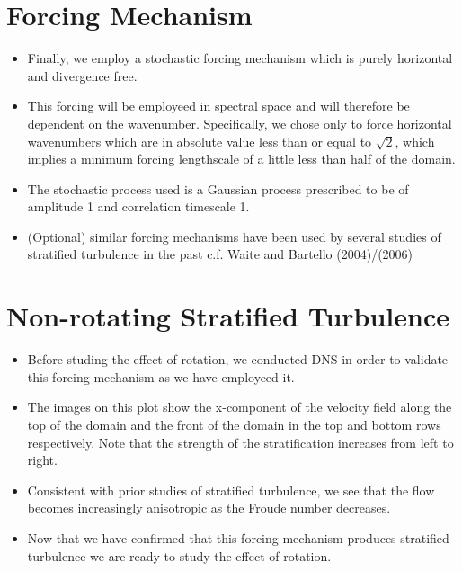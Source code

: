 \documentclass{article}
\begin{document}
\section{Forcing Mechanism}
\begin{itemize}
    \item Finally, we employ a stochastic forcing mechanism which is purely
    horizontal and divergence free. 
    \item This forcing will be employeed in spectral space and will therefore be
    dependent on the wavenumber. Specifically, we chose only to force horizontal
    wavenumbers which are in absolute value less than or equal to $\sqrt{2}$,
    which implies a minimum forcing lengthscale of a little less than half of
    the domain.
    \item The stochastic process used is a Gaussian process prescribed to be of
    amplitude 1 and correlation timescale 1. 
    \item (Optional) similar forcing mechanisms have been used by several
    studies of stratified turbulence in the past c.f. Waite and Bartello
    (2004)/(2006)
\end{itemize}

\section{Non-rotating Stratified Turbulence}
\begin{itemize}
    \item Before studing the effect of rotation, we conducted DNS in order to
    validate this forcing mechanism as we have employeed it. 
    \item The images on this plot show the x-component of the velocity field
    along the top of the domain and the front of the domain in the top and
    bottom rows respectively. Note that the strength of the stratification
    increases from left to right. 
    \item Consistent with prior studies of stratified turbulence, we see that
    the flow becomes increasingly anisotropic as the Froude number decreases. 
    \item Now that we have confirmed that this forcing mechanism produces
    stratified turbulence we are ready to study the effect of rotation. 
\end{itemize}
\end{document}
